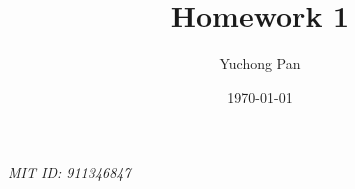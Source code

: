 \documentclass[letterpaper, reqno,11pt]{article}
\begin{document}
\title{Homework 1}
\author{Yuchong Pan}
\date{\today}
\newtheorem{theorem}{Theorem}
\newtheorem{lemma}[theorem]{Lemma}
\newtheorem{corollary}[theorem]{Corollary}
\newtheorem{fact}[theorem]{Fact}
\newtheorem{claim}{Claim}
\newtheorem{exercise}{Exercise}
\theoremstyle{definition}
\newtheorem{definition}[theorem]{Definition}
\newtheorem{solution}{Solution}
%

\begin{framed}
 \hfill \thedate
\begin{center}
\Large{\thetitle}
\end{center}
 \hfill {\em MIT ID: 911346847}
\end{framed}
\end{document}
